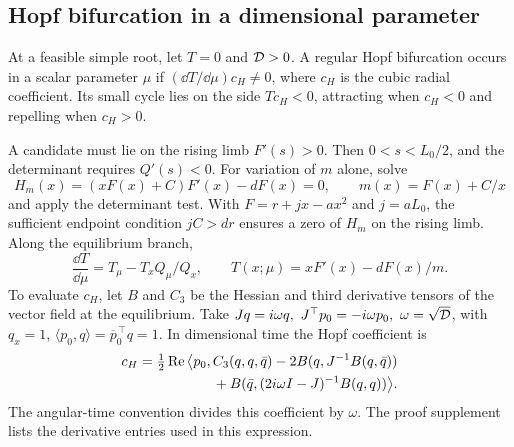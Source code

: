 \subsection{Hopf bifurcation in a dimensional parameter}
\begin{proposition}\label{prop:hopf}
At a feasible simple root, let \(T=0\) and \(\mathcal D>0\). A regular Hopf bifurcation occurs in a scalar parameter \(\mu\) if \((\dd T/\dd\mu)c_H\ne0\), where \(c_H\) is the cubic radial coefficient. Its small cycle lies on the side \(Tc_H<0\), attracting when \(c_H<0\) and repelling when \(c_H>0\).
\end{proposition}
A candidate must lie on the rising limb \(F'(s)>0\). Then \(0<s<L_0/2\), and the determinant requires \(Q'(s)<0\). For variation of \(m\) alone, solve
\[
 H_m(x)=(xF(x)+C)F'(x)-dF(x)=0,\qquad m(x)=F(x)+C/x
\]
and apply the determinant test. With \(F=r+jx-ax^2\) and \(j=aL_0\), the sufficient endpoint condition \(jC>dr\) ensures a zero of \(H_m\) on the rising limb. Along the equilibrium branch,
\begin{equation}\label{eq:Tprime}
 \frac{\dd T}{\dd\mu}=T_\mu-T_x Q_\mu/Q_x,\qquad T(x;\mu)=xF'(x)-dF(x)/m .
\end{equation}
To evaluate \(c_H\), let \(B\) and \(C_3\) be the Hessian and third derivative tensors of the vector field at the equilibrium. Take \(Jq=i\omega q,\ J^\top p_0=-i\omega p_0,\ \omega=\sqrt{\mathcal D}\), with \(q_x=1\), \(\langle p_0,q\rangle=\overline p_0^{\,\top}q=1\). In dimensional time the Hopf coefficient is \citep{kuznetsov98,kuzhopf}
\begin{equation}\label{eq:lyap}
 \begin{aligned}
 c_H=\tfrac12\operatorname{Re}\big\langle p_0,\,
 &C_3(q,q,\bar q)-2B(q,J^{-1}B(q,\bar q))\\
 &+B(\bar q,(2i\omega I-J)^{-1}B(q,q))\big\rangle .
 \end{aligned}
\end{equation}
The angular-time convention divides this coefficient by \(\omega\). The proof supplement lists the derivative entries used in this expression.


